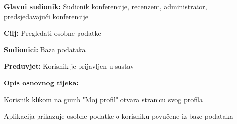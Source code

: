 					\noindent {}
					\begin{packed_item}
	
						\item \textbf{Glavni sudionik: } Sudionik konferencije, recenzent, administrator, predsjedavajući konferencije
						\item  \textbf{Cilj:} Pregledati osobne podatke
						\item  \textbf{Sudionici:} Baza podataka
						\item  \textbf{Preduvjet:} Korisnik je prijavljen u sustav
						\item  \textbf{Opis osnovnog tijeka:}
						
						\item[] \begin{packed_enum}
	
							\item Korisnik klikom na gumb "Moj profil" otvara stranicu svog profila
							\item Aplikacija prikazuje osobne podatke o korisniku povučene iz baze podataka
					
						\end{packed_enum}
			
					\end{packed_item}


